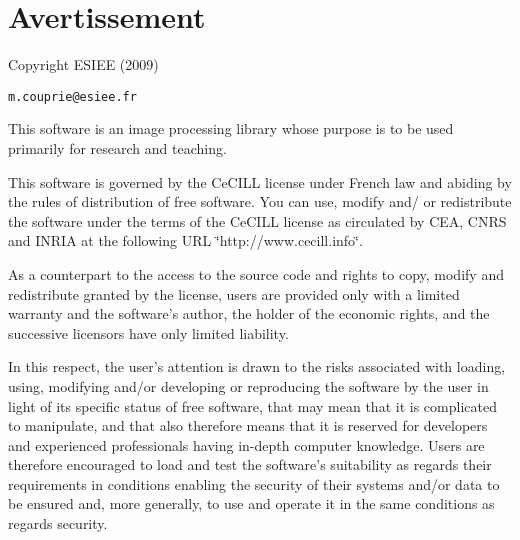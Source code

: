 \section{Avertissement}\label{warning}
Copyright ESIEE (2009)

{\tt m.couprie@esiee.fr}

This software is an image processing library whose purpose is to be used primarily for research and teaching.

This software is governed by the Ce\-CILL license under French law and abiding by the rules of distribution of free software. You can use, modify and/ or redistribute the software under the terms of the Ce\-CILL license as circulated by CEA, CNRS and INRIA at the following URL \char`\"{}http://www.cecill.info\char`\"{}.

As a counterpart to the access to the source code and rights to copy, modify and redistribute granted by the license, users are provided only with a limited warranty and the software's author, the holder of the economic rights, and the successive licensors have only limited liability.

In this respect, the user's attention is drawn to the risks associated with loading, using, modifying and/or developing or reproducing the software by the user in light of its specific status of free software, that may mean that it is complicated to manipulate, and that also therefore means that it is reserved for developers and experienced professionals having in-depth computer knowledge. Users are therefore encouraged to load and test the software's suitability as regards their requirements in conditions enabling the security of their systems and/or data to be ensured and, more generally, to use and operate it in the same conditions as regards security.

